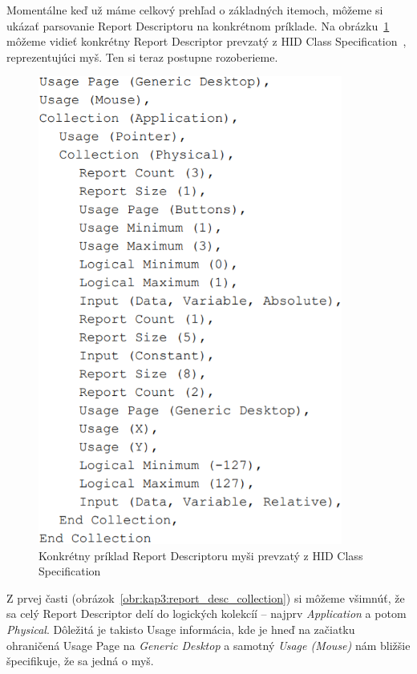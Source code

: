 Momentálne keď už máme celkový prehľad o základných itemoch, môžeme si ukázať parsovanie Report Descriptoru na konkrétnom príklade. Na obrázku~\ref{obr:kap3:full_report_desc} môžeme vidieť konkrétny Report Descriptor prevzatý z HID Class Specification~\cite{report_desc_mouse}, reprezentujúci myš. Ten si teraz postupne rozoberieme.

\begin{figure}[!htb]
	\centering
	\includegraphics[width=10cm]{img/kap03_full_report_desc}
	\caption{Konkrétny príklad Report Descriptoru myši prevzatý z HID Class Specification~\cite{report_desc_mouse}}
	\label{obr:kap3:full_report_desc}
\end{figure}

\newpage

Z prvej časti (obrázok~\ref{obr:kap3:report_desc_collection}) si môžeme všimnúť, že sa celý Report Descriptor delí do logických kolekcíí -- najprv \textit{Application} a potom \textit{Physical}. Dôležitá je takisto Usage informácia, kde je hneď na začiatku ohraničená Usage Page na \textit{Generic Desktop} a samotný \textit{Usage (Mouse)} nám bližšie špecifikuje, že sa jedná o myš.

